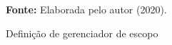 \begin{figure}[ht!]
\centering

\caption{\textmd{Definição de gerenciador de escopo}}
\label{fig:scoperef}

\par\medskip\textbf{Fonte:} Elaborada pelo autor (2020). \par\medskip

\end{figure}

